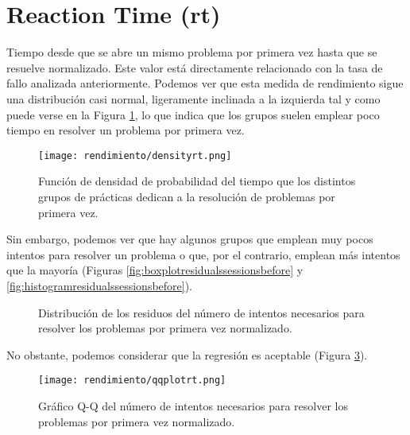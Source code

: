 \section{Reaction Time (rt)}

Tiempo desde que se abre un mismo problema por primera vez hasta que se resuelve normalizado. Este valor está directamente relacionado con la tasa de fallo analizada anteriormente. Podemos ver que esta medida de rendimiento sigue una distribución casi normal, ligeramente inclinada a la izquierda tal y como puede verse en la Figura \ref{fig:densityplotrt}, lo que indica que los grupos suelen emplear poco tiempo en resolver un problema por primera vez.

\begin{figure}[H]
    \centering
    \texttt{[image: rendimiento/densityrt.png]}
    \caption{Función de densidad de probabilidad del tiempo que los distintos grupos de prácticas dedican a la resolución de problemas por primera vez.}
    \label{fig:densityplotrt}
\end{figure}

Sin embargo, podemos ver que hay algunos grupos que emplean muy pocos intentos para resolver un problema o que, por el contrario, emplean más intentos que la mayoría (Figuras \ref{fig:boxplotresidualssessionsbefore} y \ref{fig:histogramresidualssessionsbefore}).

\begin{figure}[H]
\centering
{}\qquad
{}
\caption{Distribución de los residuos del número de intentos necesarios para resolver los problemas por primera vez normalizado.}
\label{fig:sessionsbefore}
\end{figure}

No obstante, podemos considerar que la regresión es aceptable (Figura \ref{fig:q-qsessionsbefore}).

\begin{figure}[H]
    \centering
    \texttt{[image: rendimiento/qqplotrt.png]}
    \caption{Gráfico Q-Q del número de intentos necesarios para resolver los problemas por primera vez normalizado.}
    \label{fig:q-qsessionsbefore}
\end{figure}

